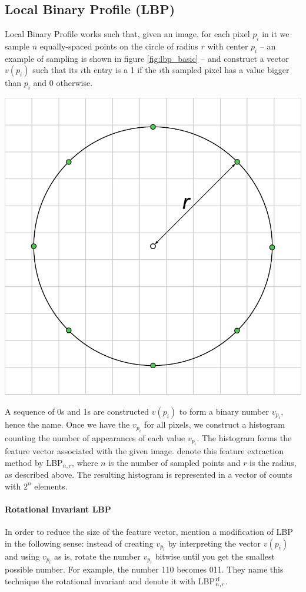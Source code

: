 \begin{multicols}{2}
\subsection{Local Binary Profile (LBP)}
Local Binary Profile works such that, given an image, for each pixel $p_i$ in it we sample $n$ equally-spaced points on the circle of radius $r$ with center $p_i$ -- an example of sampling is shown in figure \ref{fig:lbp_basic} -- and construct a vector $v(p_i)$ such that its $i$th entry is a 1 if the $i$th sampled pixel has a value bigger than $p_i$ and 0 otherwise. 
\begin{Figure}
	\centering
	\includegraphics[width=0.5\linewidth]{images/lbp_basic.pdf}
	\label{fig:lbp_basic}
\end{Figure}
A sequence of 0s and 1s are constructed $v(p_i)$ to form a binary number $v_{p_i}$, hence the name. Once we have the $v_{p_i}$ for all pixels, we construct a histogram counting the number of appearances of each value $v_{p_i}$. The histogram forms the feature vector associated with the given image. \citet{kylberg2011virus} denote this feature extraction method by LBP$_{n, r}$, where $n$ is the number of sampled points and $r$ is the radius, as described above. The resulting histogram is represented in a vector of counts with $2^n$ elements. 
\paragraph{Rotational Invariant LBP} In order to reduce the size of the feature vector, \citet{kylberg2011virus} mention a modification of LBP in the following sense: instead of creating $v_{p_i}$ by interpreting the vector $v(p_i)$ and using $v_{p_i}$ as is, rotate the number $v_{p_i}$ bitwise until you get the smallest possible number. For example, the number 110 becomes 011. They name this technique the rotational invariant and denote it with LBP$^{\textnormal{ri}}_{n,r}$.

\end{multicols}
